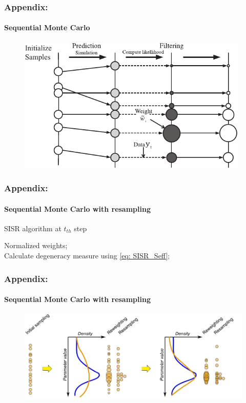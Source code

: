\begin{frame}
\frametitle{Appendix:}
\framesubtitle{Sequential Monte Carlo}
\begin{figure}[ht]
    \includegraphics[width = 110mm]{figures/figure-PF-SIS.pdf}
\end{figure}
\end{frame}
\begin{frame}
\frametitle{Appendix:}
\framesubtitle{Sequential Monte Carlo with resampling}
\begin{algorithm}[H]    
    \caption{SISR algorithm at $t_{th}$ step}
    \label{Algorithm:SISR}
        Normalized weights;\\
        Calculate degeneracy measure using \cref{eq: SISR_Seff};\\
\end{algorithm}
\end{frame}
\begin{frame}
\frametitle{Appendix:}
\framesubtitle{Sequential Monte Carlo with resampling}
\begin{figure}[ht]
    \includegraphics[width = 130mm]{figures/figure-PF-SISR.pdf}
\end{figure}
\end{frame}

